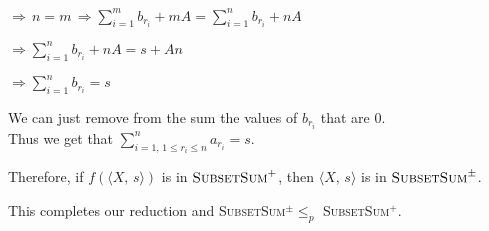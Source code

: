\documentclass{article}
\begin{document}
\medskip $\Rightarrow\,n=m\,\Rightarrow\sum_{i=1} ^{m} b_{r_i}+mA=\sum_{i=1} ^{n} b_{r_i}+nA$

\medskip $\Rightarrow\sum_{i=1} ^{n} b_{r_i}+nA=s+An$

\medskip $\Rightarrow\sum_{i=1} ^{n} b_{r_i}=s$

\medskip\noindent We can just remove from the sum the values of $b_{r_i}$ that are 0.
\\Thus we get that $\sum_{i=1,\,1\leq r_i\leq n} ^{n} a_{r_i}=s$.

\medskip\noindent Therefore, if $f(\langle X,\, s\rangle)$ is in $\textsc{SubsetSum}^+$, then $\langle X,\, s\rangle$ is in $\textsc{SubsetSum}^\pm$.

\bigskip\noindent This completes our reduction and \textsc{SubsetSum}$^\pm\leq_p$ \textsc{SubsetSum}$^+$.
\end{document}
